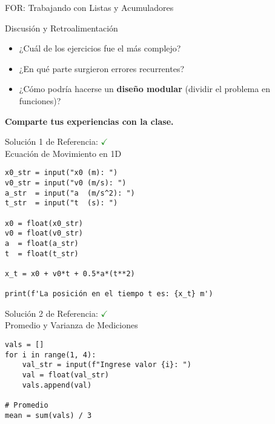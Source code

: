 \documentclass[10pt]{beamer}
\begin{document}
\begin{frame}[fragile]{FOR: Trabajando con Listas y Acumuladores}
\begin{frame}{Discusión y Retroalimentación}
  \begin{itemize}
    \item ¿Cuál de los ejercicios fue el más complejo?
    \item ¿En qué parte surgieron errores recurrentes?
    \item ¿Cómo podría hacerse un \textbf{diseño modular} (dividir el problema en funciones)?
  \end{itemize}
  \vspace{0.2cm}
  \textbf{Comparte tus experiencias con la clase.}
\end{frame}

\begin{frame}[fragile]{Solución 1 de Referencia: \hfill \textcolor{green}{$\checkmark$} \\ Ecuación de Movimiento en 1D}
\begin{verbatim}
x0_str = input("x0 (m): ")
v0_str = input("v0 (m/s): ")
a_str  = input("a  (m/s^2): ")
t_str  = input("t  (s): ")

x0 = float(x0_str)
v0 = float(v0_str)
a  = float(a_str)
t  = float(t_str)

x_t = x0 + v0*t + 0.5*a*(t**2)

print(f'La posición en el tiempo t es: {x_t} m')
\end{verbatim}
\end{frame}

\begin{frame}[fragile]{Solución 2 de Referencia: \hfill \textcolor{green}{$\checkmark$} \\ Promedio y Varianza de Mediciones}
\begin{verbatim}
vals = []
for i in range(1, 4):
    val_str = input(f"Ingrese valor {i}: ")
    val = float(val_str)
    vals.append(val)

# Promedio
mean = sum(vals) / 3


\end{verbatim}
\end{frame}
\end{frame}
\end{document}
